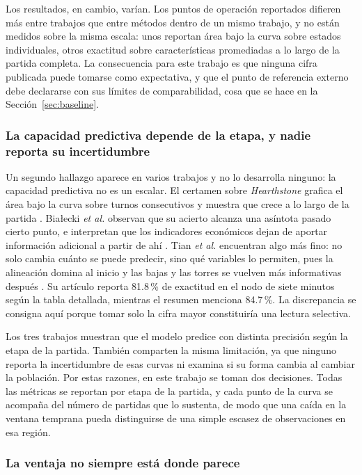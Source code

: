 Los resultados, en cambio, varían. Los puntos de operación
reportados difieren más entre trabajos que entre métodos dentro de un mismo
trabajo, y no están medidos sobre la misma escala: unos reportan área bajo
la curva sobre estados individuales, otros exactitud sobre características
promediadas a lo largo de la partida completa. La consecuencia para este
trabajo es que ninguna cifra publicada puede tomarse como expectativa, y
que el punto de referencia externo debe declararse con sus límites de
comparabilidad, cosa que se hace en la Sección~\ref{sec:baseline}.

\subsubsection{La capacidad predictiva depende de la etapa, y nadie reporta
su incertidumbre}

Un segundo hallazgo aparece en varios trabajos y no lo desarrolla ninguno:
la capacidad predictiva no es un escalar. El certamen sobre
\emph{Hearthstone} grafica el área bajo la curva sobre turnos consecutivos y
muestra que crece a lo largo de la partida
\cite{janusz_hearthstone_2017}. Bia\l ecki \textit{et al.} observan que su
acierto alcanza una asíntota pasado cierto punto, e interpretan que los
indicadores económicos dejan de aportar información adicional a partir de
ahí \cite{bialecki_sc2egset_2023}. Tian \textit{et al.} encuentran algo más
fino: no solo cambia cuánto se puede predecir, sino qué variables lo
permiten, pues la alineación domina al inicio y las bajas y las torres se
vuelven más informativas después \cite{tian_hero_2022}. Su artículo reporta
81.8\,\% de exactitud en el nodo de siete minutos según la tabla detallada,
mientras el resumen menciona 84.7\,\%. La discrepancia se consigna aquí
porque tomar solo la cifra mayor constituiría una lectura selectiva.

Los tres trabajos muestran que el modelo predice con distinta precisión
según la etapa de la partida. También comparten la misma limitación, ya que ninguno reporta la
incertidumbre de esas curvas ni examina si su forma cambia al cambiar la
población. Por estas razones, en este trabajo se toman dos decisiones.
Todas las métricas se reportan por etapa de la partida, y cada punto de la
curva se acompaña del número de partidas que lo sustenta, de modo que una
caída en la ventana temprana pueda distinguirse de una simple escasez de
observaciones en esa región.

\subsubsection{La ventaja no siempre está donde parece}

